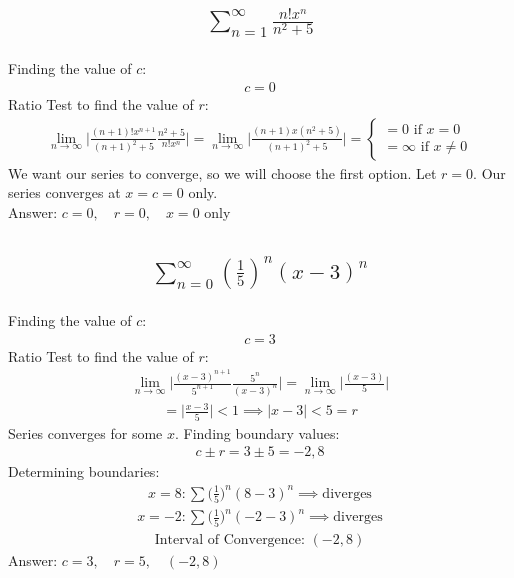 \documentclass{article}
\begin{document}
\subsection{
	\begin{align*}
		\sum_{n = 1}^\infty \frac{n! x^n}{n^2 + 5}
	\end{align*}
}
Finding the value of $c$:
\begin{align*}
	c = 0
\end{align*}
Ratio Test to find the value of $r$: 
\begin{align*}
	\lim_{n \to \infty} \bigg| \frac{(n + 1)! x^{n + 1}}{(n + 1)^2 + 5} \frac{n^2 + 5}{n! x^n} \bigg| = \lim_{n \to \infty} \bigg| \frac{(n + 1)x (n^2 + 5)}{(n + 1)^2 + 5} \bigg| = 
	\begin{cases}
		= 0 \text{ if } x = 0 \\
		= \infty \text{ if } x \neq 0
	\end{cases}
\end{align*}
We want our series to converge, so we will choose the first option. Let $r = 0$. Our series converges at $x = c = 0$ only. \\[10pt]
Answer: $c = 0, \quad r = 0, \quad x = 0$ only

\subsection{
	\begin{align*}
		\sum_{n = 0}^\infty \left( \frac{1}{5} \right)^n (x - 3)^n
	\end{align*}
}
Finding the value of $c$:
\begin{align*}
	c = 3
\end{align*}
Ratio Test to find the value of $r$:
\begin{align*}
	\lim_{n \to \infty} \bigg| \frac{(x - 3)^{n + 1}}{5^{n + 1}} \frac{5^n}{(x - 3)^n} \bigg| = \lim_{n \to \infty} \bigg| \frac{(x - 3)}{5} \bigg|
\end{align*}
\begin{align*}
	= \bigg| \frac{x - 3}{5} \bigg| < 1 \implies |x - 3| < 5 = r
\end{align*}
Series converges for some $x$. Finding boundary values:
\begin{align*}
	c \pm r = 3 \pm 5 = -2, 8
\end{align*}
Determining boundaries:
\begin{align*}
	x = 8: \sum \bigg( \frac{1}{5} \bigg)^n (8 - 3)^n \implies \text{diverges}
\end{align*}
\begin{align*}
	x = -2: \sum \bigg( \frac{1}{5} \bigg)^n (-2 - 3)^n \implies \text{diverges}
\end{align*}
\begin{align*}
	\text{Interval of Convergence: } (-2, 8)
\end{align*}
Answer: $c = 3, \quad r = 5, \quad (-2, 8)$
\end{document}
